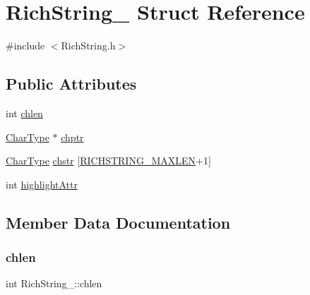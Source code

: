 \hypertarget{structRichString__}{}\section{Rich\+String\+\_\+ Struct Reference}
\label{structRichString__}


{\ttfamily \#include $<$Rich\+String.\+h$>$}

\subsection*{Public Attributes}
\begin{DoxyCompactItemize}
\item 
int \hyperlink{structRichString___ae1fac4515c48ce1b54210bb60243c967}{chlen}
\item 
\hyperlink{RichString_8h_a6d7a32b0391d3dc5b23cdb2442f9993a}{Char\+Type} $\ast$ \hyperlink{structRichString___ad3fe0405109f94bf07ddddb7d2373897}{chptr}
\item 
\hyperlink{RichString_8h_a6d7a32b0391d3dc5b23cdb2442f9993a}{Char\+Type} \hyperlink{structRichString___a9f6588f195edfe05c1fa7b3d811b49ab}{chstr} \mbox{[}\hyperlink{RichString_8h_ac992b99af185d6d1c0147ac407b2c146}{R\+I\+C\+H\+S\+T\+R\+I\+N\+G\+\_\+\+M\+A\+X\+L\+EN}+1\mbox{]}
\item 
int \hyperlink{structRichString___aa29c2028a13bab264eba4d966b23a586}{highlight\+Attr}
\end{DoxyCompactItemize}


\subsection{Member Data Documentation}
\mbox{\label{structRichString___ae1fac4515c48ce1b54210bb60243c967}} 
\subsubsection{\texorpdfstring{chlen}{chlen}}
{\footnotesize\ttfamily int Rich\+String\+\_\+\+::chlen}

\mbox{\label{structRichString___ad3fe0405109f94bf07ddddb7d2373897}} 
